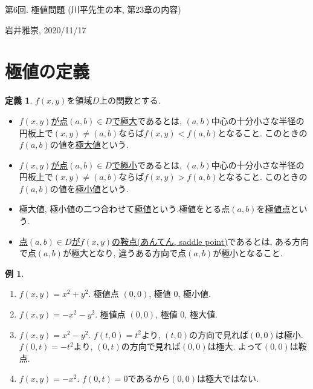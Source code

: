 \documentclass[dvipdfmx,a4paper,11pt]{article}
\theoremstyle{definition}
\newtheorem{dfn}[thm]{定義}
\newtheorem{exa}[thm]{例}
\begin{document}
\newpage
\begin{center}
{\Large 第6回. 極値問題 (川平先生の本, 第23章の内容)}
\end{center}

\begin{flushright}
 岩井雅崇, 2020/11/17
\end{flushright}

\section{極値の定義}
\begin{tcolorbox}[
    colback = white,
    colframe = green!35!black,
    fonttitle = \bfseries,
    breakable = true]
    \begin{dfn}
    $f(x,y)$を領域$D$上の関数とする.
\begin{itemize}
\item \underline{$f(x,y)$が点$(a,b)\in D$で極大}であるとは, $(a,b)$中心の十分小さな半径の円板上で$(x,y) \neq (a,b)$ならば$f(x,y) < f(a,b)$となること.
このときの$f(a,b)$の値を\underline{極大値}という.
\item \underline{$f(x,y)$が点$(a,b)\in D$で極小}であるとは, $(a,b)$中心の十分小さな半径の円板上で$(x,y) \neq (a,b)$ならば$f(x,y) > f(a,b)$となること.
このときの$f(a,b)$の値を\underline{極小値}という.
\item  極大値, 極小値の二つ合わせて\underline{極値}という.極値をとる点$(a,b)$を\underline{極値点}という.
\item \underline{点$(a,b)\in D$が$f(x,y)$の鞍点(あんてん, saddle point)}であるとは, ある方向で点$(a,b)$が極大となり, 違うある方向で点$(a,b)$が極小となること.
\end{itemize}
    \end{dfn}
    \end{tcolorbox}
    
\begin{exa}
\begin{enumerate}
\item $f(x,y)=x^2 + y^2$. 極値点 $(0,0)$, 極値 0, 極小値.
\item $f(x,y)=-x^2 - y^2$. 極値点 $(0,0)$, 極値 0, 極大値.
\item $f(x,y)=x^2 -y^2$.
$f(t,0) = t^2$より, $(t,0)$の方向で見れば$(0,0)$は極小.
$f(0,t) = -t^2$より, $(0,t)$の方向で見れば$(0,0)$は極大.
よって$(0,0)$は鞍点.
\item $f(x,y)=-x^2 $. $f(0,t) =0$であるから$(0,0)$は極大ではない. 
\end{enumerate}

\end{exa}
\end{document}

